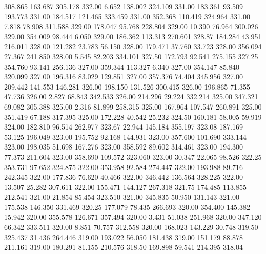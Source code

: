  308.865  163.687  305.178       332.00
   6.652  138.002  324.109       331.00
 183.361   93.509  193.773       331.00
 184.517  121.465  333.459       331.00
 352.368  110.419  324.964       331.00
   7.818   78.908  311.588       329.00
 178.047   95.768  228.804       329.00
  10.390   76.964  300.026       329.00
 354.009   98.444    6.050       329.00
 186.362  113.313  270.601       328.87
 184.284   43.951  216.011       328.00
 121.282   23.783   56.150       328.00
 179.471   37.760   33.723       328.00
 356.094   27.367  241.850       328.00
   5.545   82.203  334.101       327.50
 172.793   92.541  275.155       327.25
 354.760   93.141  256.136       327.00
 359.344  113.327    6.340       327.00
 354.147   85.840  320.099       327.00
 196.316   83.029  129.851       327.00
 357.376   74.404  345.956       327.00
 209.442  141.553  146.281       326.00
 198.150  131.526  300.415       326.00
 196.865   71.355   47.736       326.00
   2.827   68.843  342.533       326.00
 214.296   29.224  332.214       325.00
 347.321   69.082  305.388       325.00
   2.316   81.899  258.315       325.00
 167.964  107.547  260.891       325.00
 351.419   67.188  317.395       325.00
 172.228   40.542   25.232       324.50
 160.181   58.005   59.919       324.00
 182.810   96.514  262.977       323.67
  22.944  145.184  355.197       323.08
 187.169   53.125  196.049       323.00
 195.752   92.168  144.931       323.00
 357.600  101.690  333.144       323.00
 198.035   51.698  167.276       323.00
 358.592   89.602  314.461       323.00
 194.300   77.373  211.604       323.00
 358.690  109.572  323.060       323.00
  30.347   22.065   98.526       322.25
 353.731   97.652  324.875       322.00
 353.958   92.584  274.447       322.00
 193.988   89.716  242.345       322.00
 177.836   76.620   40.466       322.00
 346.442  136.564  328.225       322.00
  13.507   25.282  307.611       322.00
 155.471  144.127  267.318       321.75
 174.485  113.855  212.541       321.00
  21.854   85.454  323.510       321.00
 345.835   50.950  131.143       321.00
 175.538  146.350  331.469       320.25
 177.079   78.435  266.693       320.00
 354.400  145.382   15.942       320.00
 355.578  126.671  357.494       320.00
   3.431   51.038  251.968       320.00
 347.120   66.342  333.511       320.00
   8.851   70.757  312.558       320.00
 168.023  143.229   30.748       319.50
 325.437   31.436  264.446       319.00
 193.022   56.050  181.438       319.00
 151.179   88.878  211.161       319.00
 180.291   81.155  210.576       318.50
 169.898   59.541  214.395       318.04
